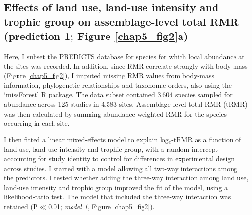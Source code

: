 \subsection{Effects of land use, land-use intensity and trophic group on assemblage-level total RMR (prediction 1; Figure \ref{chap5_fig2}a)}

Here, I subset the PREDICTS database for species for which local abundance at the sites was recorded. In addition, since RMR correlate strongly with body mass (Figure \ref{chap5_fig2}), I imputed missing RMR values from body-mass information, phylogenetic relationships and taxonomic orders, also using the `missForest' R package. The data subset contained 3,604 species sampled for abundance across 125 studies in 4,583 sites. Assemblage-level total RMR (tRMR) was then calculated by summing abundance-weighted RMR for the species occurring in each site. 

I then fitted a linear mixed-effects model to explain log$_e$-tRMR as a function of land use, land-use intensity and trophic group, with a random intercept accounting for study identity to control for differences in experimental design across studies. I started with a model allowing all two-way interactions among the predictors. I tested whether adding the three-way interaction among land use, land-use intensity and trophic group improved the fit of the model, using a likelihood-ratio test. The model that included the three-way interaction was retained (P$\ll$0.01; \textit{model 1}, Figure \ref{chap5_fig2}). 


